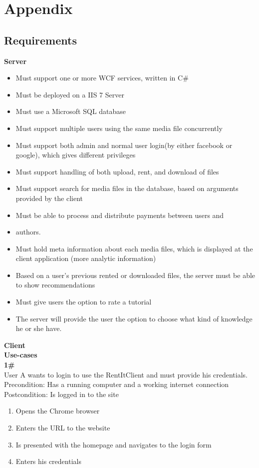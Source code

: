 \section{Appendix}
\subsection{Requirements}
\textbf{Server}
\begin{itemize}
\item Must support one or more WCF services, written in C\#
\item Must be deployed on a IIS 7 Server
\item Must use a Microsoft SQL database
\item Must support multiple users using the same media file concurrently
\item Must support both admin and normal user login(by either facebook or
google), which gives different privileges
\item Must support handling of both upload, rent, and download of files
\item Must support search for media files in the database, based on arguments provided by the client
\item Must be able to process and distribute payments between users and \item authors. 
\item Must hold meta information about each media files, which is displayed at the client application (more analytic information)
\item Based on a user’s previous rented or downloaded files, the server must be able to show recommendations
\item Must give users the option to rate a tutorial
\item The server will provide the user the option to choose what kind of knowledge he or she have. 
\end{itemize}
\vspace{10pt}

\textbf{Client}\\
\textbf{Use-cases}\\
\textbf{1\#}\\
User A wants to login to use the RentItClient and must provide his credentials.
Precondition: Has a running computer and a working internet connection
Postcondition: Is logged in to the site
\begin{enumerate}
\item Opens the Chrome browser
\item Enters the URL to the website
\item Is presented with the homepage and navigates to the login form
\item Enters his credentials
\end{enumerate}

